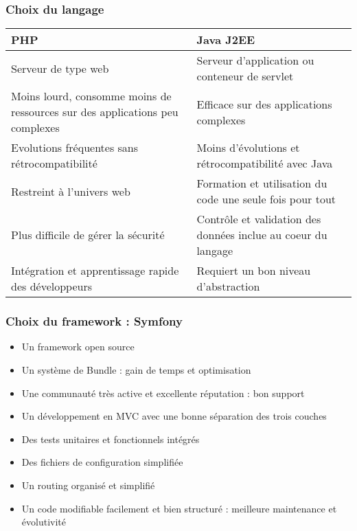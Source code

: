 \begin{frame}
  \frametitle{Choix du langage}
  \begin{center}
    \begin{tabular}[h]{|p{}|p{}|}
	\hline
	\cellcolor{blue!15}PHP & \cellcolor{blue!15}Java J2EE \\\hline
        Serveur de type web & Serveur d'application ou conteneur de servlet \\\hline
        Moins lourd, consomme moins de ressources sur des applications peu complexes & Efficace sur des applications complexes \\\hline
        Evolutions fréquentes sans rétrocompatibilité & Moins d'évolutions et rétrocompatibilité avec Java \\\hline
        Restreint à l'univers web & Formation et utilisation du code une seule fois pour tout \\\hline
        Plus difficile de gérer la sécurité & Contrôle et validation des données inclue au coeur du langage \\\hline
        Intégration et apprentissage rapide des développeurs & Requiert un bon niveau d'abstraction \\\hline
    \end{tabular}
  \end{center}
\end{frame}

\begin{frame}
  \frametitle{Choix du framework : Symfony}
  \begin{itemize}
    \item Un framework open source
    \item Un système de Bundle : gain de temps et optimisation
    \item Une communauté très active et excellente réputation : bon support  
    \item Un développement en MVC avec une bonne séparation des trois couches
    \item Des tests unitaires et fonctionnels intégrés
    \item Des fichiers de configuration simplifiée
    \item Un routing organisé et simplifié
    \item Un code modifiable facilement et bien structuré : meilleure maintenance et évolutivité
  \end{itemize}
\end{frame}

